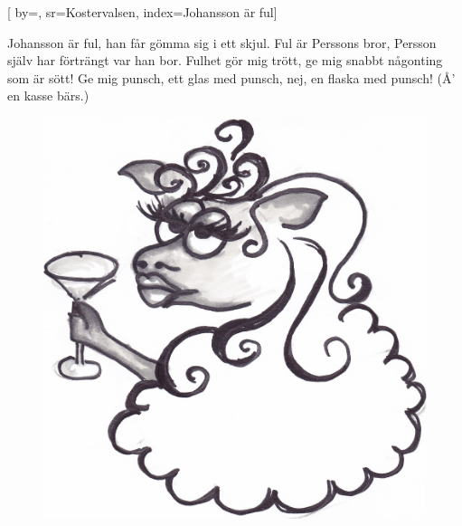 

[ 		%
	by={},					%
	sr={Kostervalsen},					%
	index={Johansson är ful}]						%
	

\beginverse*						%
Johansson är ful,
han får gömma sig i ett skjul.
Ful är Perssons bror,
Persson själv har förträngt var han bor.
Fulhet gör mig trött,
ge mig snabbt någonting som är sött!
Ge mig punsch,
ett glas med punsch,
nej, en flaska med punsch!
(Å' en kasse bärs.)
\endverse							%



\endsong							%

\begin{figure}[!b]
 \begin{center}
\includegraphics[scale=.2]{../bilder/drickande_far.jpg} 
\end{center}
\end{figure}